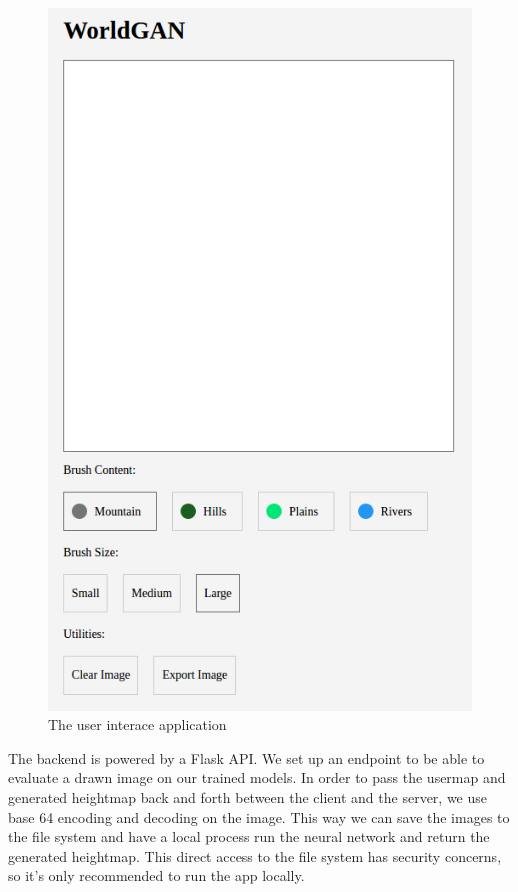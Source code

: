 \documentclass[twocolumn]{article}
\begin{document}
	\begin{figure}[h!]
	\includegraphics[width=1\columnwidth]{ui.png} 
	\caption{The user interace application}
	\end{figure}
	
	The backend is powered by a Flask API. We set up an endpoint to be able to evaluate a drawn image on our trained models. In order to pass the usermap and generated heightmap back and forth between the client and the server, we use base 64 encoding and decoding on the image. This way we can save the images to the file system and have a local process run the neural network and return the generated heightmap. This direct access to the file system has security concerns, so it's only recommended to run the app locally.
	
\end{document}
